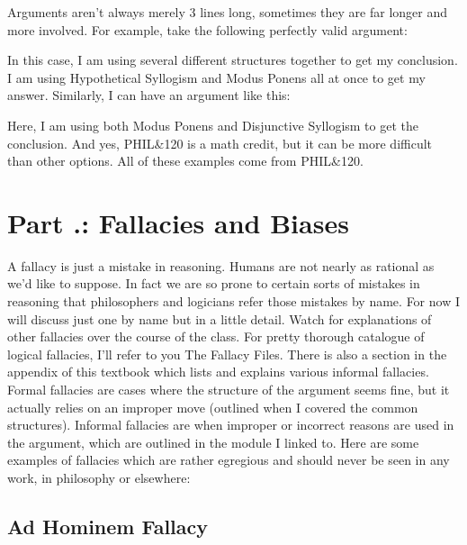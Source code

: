 Arguments aren't always merely 3 lines long, sometimes they are far longer and more involved. For example, take the following perfectly valid argument:


In this case, I am using several different structures together to get my conclusion. I am using Hypothetical Syllogism and Modus Ponens all at once to get my answer. Similarly, I can have an argument like this:


Here, I am using both Modus Ponens and Disjunctive Syllogism to get the conclusion. And yes, PHIL\&120 is a math credit, but it can be more difficult than other options. All of these examples come from PHIL\&120. 

\section{Part \thechapcount.\theseccount: Fallacies and Biases}
\label{s:p1.4}

A fallacy is just a mistake in reasoning. Humans are not nearly as rational as we’d like to suppose. In fact we are so prone to certain sorts of mistakes in reasoning that philosophers and logicians refer those mistakes by name. For now I will discuss just one by name but in a little detail. Watch for explanations of other fallacies over the course of the class. For pretty thorough catalogue of logical fallacies, I’ll refer to you The Fallacy Files.\autocite{Curtis1} There is also a section in the appendix of this textbook which lists and explains various informal fallacies. Formal fallacies are cases where the structure of the argument seems fine, but it actually relies on an improper move (outlined when I covered the common structures). Informal fallacies are when improper or incorrect reasons are used in the argument, which are outlined in the module I linked to. Here are some examples of fallacies which are rather egregious and should never be seen in any work, in philosophy or elsewhere: 
\subsection{Ad Hominem Fallacy}


